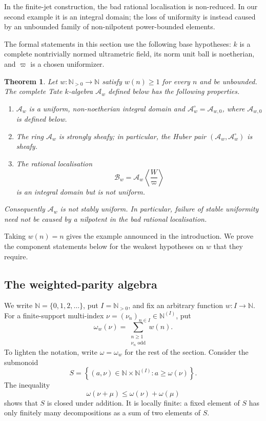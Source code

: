 \documentclass[11pt,reqno]{amsart}
\newtheorem{theorem}{Theorem}[section]
\theoremstyle{definition}
\begin{document}
In the finite-jet construction, the bad rational localisation is non-reduced.
In our second example it is an integral domain; the loss of uniformity is
instead caused by an unbounded family of non-nilpotent power-bounded elements.

The formal statements in this section use the following base hypotheses:
$k$ is a complete nontrivially normed ultrametric field, its norm unit ball is
noetherian, and $\varpi$ is a chosen uniformizer.

\begin{theorem}\label{thm:second-example}
Let $w:\mathbb N_{>0}\to\mathbb N$ satisfy $w(n)\geq1$ for every $n$ and
be unbounded.  The complete Tate $k$-algebra $\mathcal A_w$ defined below has
the following properties.
\begin{enumerate}
\item $\mathcal A_w$ is a uniform, non-noetherian integral domain and
      $\mathcal A_w^\circ=\mathcal A_{w,0}$, where $\mathcal A_{w,0}$ is defined below.
\item The ring $\mathcal A_w$ is strongly sheafy; in particular, the Huber pair
      $(\mathcal A_w,\mathcal A_w^\circ)$ is sheafy.
\item The rational localisation
      \[
        \mathcal B_w=\mathcal A_w\left\langle\frac{W}{\varpi}\right\rangle
      \]
      is an integral domain but is not uniform.
\end{enumerate}
Consequently $\mathcal A_w$ is not stably uniform.  In particular, failure of
stable uniformity need not be caused by a nilpotent in the bad rational
localisation.
\end{theorem}

Taking $w(n)=n$ gives the example announced in the introduction.  We prove
the component statements below for the weakest hypotheses on $w$ that they
require.

\subsection{The weighted-parity algebra}

We write $\mathbb N=\{0,1,2,\ldots\}$, put $I=\mathbb N_{>0}$, and fix an
arbitrary function $w:I\to\mathbb N$.  For a finite-support multi-index
$\nu=(\nu_n)_{n\in I}\in\mathbb N^{(I)}$, put
\begin{equation}\label{eq:parity-weight}
  \omega_w(\nu)=\sum_{\substack{n\geq1\\ \nu_n\text{ odd}}} w(n).
\end{equation}
To lighten the notation, write $\omega=\omega_w$ for the rest of the section.
Consider the submonoid
\begin{equation}\label{eq:parity-monoid}
  S=\left\{(a,\nu)\in\mathbb N\times\mathbb N^{(I)}:
       a\geq\omega(\nu)\right\}.
\end{equation}
The inequality
\begin{equation}\label{eq:omega-subadditive}
  \omega(\nu+\mu)\leq\omega(\nu)+\omega(\mu)
\end{equation}
shows that $S$ is closed under addition.  It is locally finite: a fixed element of $S$ has
only finitely many decompositions as a sum of two elements of $S$.
\end{document}
